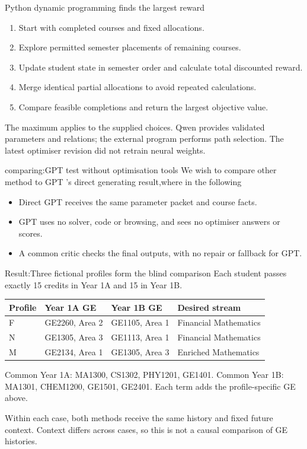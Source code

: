 \documentclass[aspectratio=169,11pt]{beamer}
\newcommand{\smallnote}[1]{\par{\footnotesize\color{muted}#1\par}}
\begin{document}
\begin{frame}{Python dynamic programming finds the largest reward}
\begin{enumerate}\setlength{\itemsep}{7pt}
\item Start with completed courses and fixed allocations.
\item Explore permitted semester placements of remaining courses.
\item Update student state in semester order and calculate total discounted reward.
\item Merge identical partial allocations to avoid repeated calculations.
\item Compare feasible completions and return the largest objective value.
\end{enumerate}
\smallnote{The maximum applies to the supplied choices. Qwen provides validated parameters and relations; the external program performs path selection. The latest optimiser revision did not retrain neural weights.}
\end{frame}

\begin{frame}{comparing:GPT test without optimisation tools}
We wish to compare other method to GPT 's direct generating result,where in the following
\begin{itemize}\setlength{\itemsep}{7pt}
\item Direct GPT receives the same parameter packet and course facts.
\item GPT uses no solver, code or browsing, and sees no optimiser answers or scores.
\item A common critic checks the final outputs, with no repair or fallback for GPT.
\end{itemize}

\end{frame}
\begin{frame}{Result:Three fictional profiles form the blind comparison}
Each student passes exactly 15 credits in Year 1A and 15 in Year 1B.
\vspace{1mm}
\begin{tabular}{lL{3cm}L{3cm}L{4cm}}
\toprule
Profile & Year 1A GE & Year 1B GE & Desired stream\\\midrule
F & GE2260, Area 2 & GE1105, Area 1 & Financial Mathematics\\[4pt]
N & GE1305, Area 3 & GE1113, Area 1 & Financial Mathematics\\[4pt]
M & GE2134, Area 1 & GE1305, Area 3 & Enriched Mathematics\\
\bottomrule
\end{tabular}\par
\vspace{2mm}
\smallnote{Common Year 1A: MA1300, CS1302, PHY1201, GE1401. Common Year 1B: MA1301, CHEM1200, GE1501, GE2401. Each term adds the profile-specific GE above.}
\smallnote{Within each case, both methods receive the same history and fixed future context. Context differs across cases, so this is not a causal comparison of GE histories.}
\end{frame}
\end{document}
